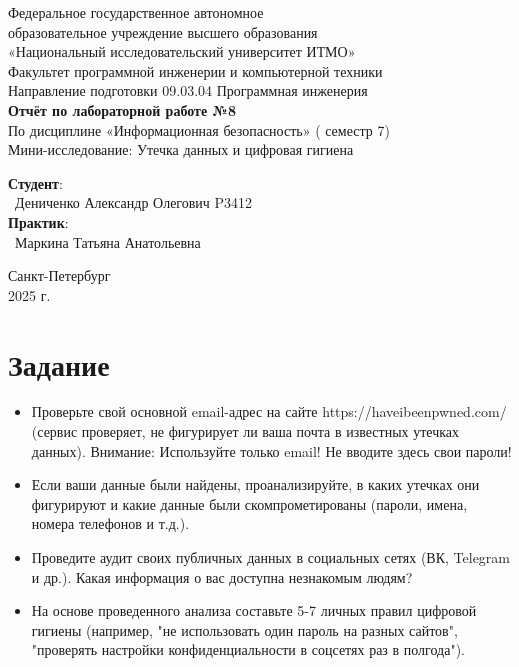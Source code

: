 \documentclass{article}
\begin{document}
\begin{center}
    \Large
    Федеральное государственное автономное \\
    образовательное учреждение высшего образования \\ 
    «Национальный исследовательский университет ИТМО»\\
    \vspace{0.5cm}
    \large
    Факультет программной инженерии и компьютерной техники \\
    Направление подготовки 09.03.04 Программная инженерия \\
    \vspace{1cm}
    \Large
    \textbf{Отчёт по лабораторной работе №8} \\
        По дисциплине «Информационная безопасность» ( семестр 7)\\
        Мини-исследование: Утечка данных и цифровая гигиена
    \large
    \vspace{8cm}

    \begin{minipage}{.33\textwidth}
    \end{minipage}
    \hfill
    \begin{minipage}{.4\textwidth}
    
        \textbf{Студент}: \vspace{.1cm} \\
        \ Дениченко Александр Олегович P3412\\
        \textbf{Практик}:  \\
        \ Маркина Татьяна Анатольевна
    \end{minipage}
    \vfill
Санкт-Петербург\\ 2025 г.
\end{center}
\pagestyle{empty}
\newpage
\pagestyle{plain}

\section*{Задание}

\begin{itemize}
    \item Проверьте свой основной email-адрес на сайте https://haveibeenpwned.com/ (сервис проверяет, не фигурирует ли ваша почта в известных утечках данных). Внимание: Используйте только email! Не вводите здесь свои пароли!
    \item Если ваши данные были найдены, проанализируйте, в каких утечках они фигурируют и какие данные были скомпрометированы (пароли, имена, номера телефонов и т.д.).
    \item Проведите аудит своих публичных данных в социальных сетях (ВК, Telegram и др.). Какая информация о вас доступна незнакомым людям?
    \item На основе проведенного анализа составьте 5-7 личных правил цифровой гигиены (например, "не использовать один пароль на разных сайтов", "проверять настройки конфиденциальности в соцсетях раз в полгода").
\end{itemize}
\end{document}

